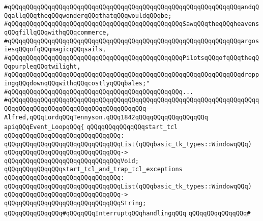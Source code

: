 \verb|#qQQqqQQqqQQqqQQqqQQqqQQqqQQqqQQqqQQqqQQqqQQqqQQqqQQqqQQqqQQqqQQqandqQQqallqQQqtheqQQqwonderqQQqthatqQQqwouldqQQqbe;|\newline
\verb|#qQQqqQQqqQQqqQQqqQQqqQQqqQQqqQQqqQQqqQQqqQQqqQQqSawqQQqtheqQQqheavensqQQqfillqQQqwithqQQqcommerce,|\newline
\verb|#qQQqqQQqqQQqqQQqqQQqqQQqqQQqqQQqqQQqqQQqqQQqqQQqqQQqqQQqqQQqqQQqargosiesqQQqofqQQqmagicqQQqsails,|\newline
\verb|#qQQqqQQqqQQqqQQqqQQqqQQqqQQqqQQqqQQqqQQqqQQqqQQqPilotsqQQqofqQQqtheqQQqpurpleqQQqtwilight,|\newline
\verb|#qQQqqQQqqQQqqQQqqQQqqQQqqQQqqQQqqQQqqQQqqQQqqQQqqQQqqQQqqQQqqQQqdroppingqQQqdownqQQqwithqQQqcostlyqQQqbales;"|\newline
\verb|#qQQqqQQqqQQqqQQqqQQqqQQqqQQqqQQqqQQqqQQqqQQqqQQq...|\newline
\verb|#qQQqqQQqqQQqqQQqqQQqqQQqqQQqqQQqqQQqqQQqqQQqqQQqqQQqqQQqqQQqqQQqqQQqqQQqqQQqqQQqqQQqqQQqqQQqqQQqqQQqqQQqqQQq--Alfred,qQQqLordqQQqTennyson.qQQq1842qQQqqQQqqQQqqQQqqQQq|\newline
\newline
\newline
\newline
\verb|apiqQQqEvent_LoopqQQq{|\newline
\newline
\verb|qQQqqQQqqQQqqQQqstart_tcl|\newline
\verb|qQQqqQQqqQQqqQQqqQQqqQQqqQQqqQQq:|\newline
\verb|qQQqqQQqqQQqqQQqqQQqqQQqqQQqqQQqList(qQQqbasic_tk_types::WindowqQQq)|\newline
\verb|qQQqqQQqqQQqqQQqqQQqqQQqqQQqqQQq->|\newline
\verb|qQQqqQQqqQQqqQQqqQQqqQQqqQQqqQQqVoid;|\newline
\newline
\verb|qQQqqQQqqQQqqQQqstart_tcl_and_trap_tcl_exceptions|\newline
\verb|qQQqqQQqqQQqqQQqqQQqqQQqqQQqqQQq:|\newline
\verb|qQQqqQQqqQQqqQQqqQQqqQQqqQQqqQQqList(qQQqbasic_tk_types::WindowqQQq)|\newline
\verb|qQQqqQQqqQQqqQQqqQQqqQQqqQQqqQQq->|\newline
\verb|qQQqqQQqqQQqqQQqqQQqqQQqqQQqqQQqString;|\newline
\newline
\verb|qQQqqQQqqQQqqQQq#qQQqqQQqInterruptqQQqhandlingqQQq|\newline
\verb|qQQqqQQqqQQqqQQq#|\newline
